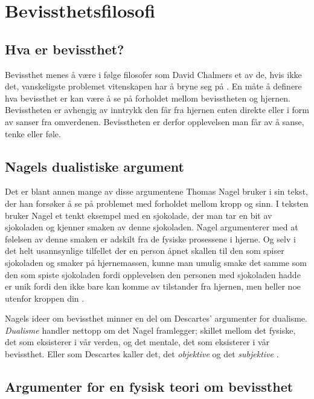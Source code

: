 \section{Bevissthetsfilosofi}

\subsection{Hva er bevissthet?}

Bevissthet menes å være i følge filosofer som David Chalmers et av de, hvis ikke det, 
vanskeligste problemet vitenskapen har å bryne seg på \autocite{Chalmers1995}. 
En måte å definere hva bevissthet er kan være å se på forholdet mellom bevisstheten og hjernen.
Bevisstheten er avhengig av inntrykk den får fra hjernen enten direkte eller i form av sanser fra omverdenen. 
Bevisstheten er derfor opplevelsen man får av å sanse, tenke eller føle. 

\subsection{Nagels dualistiske argument}

Det er blant annen mange av disse argumentene Thomas Nagel bruker i sin tekst, 
der han forsøker å se på problemet med forholdet mellom kropp og sinn.
I teksten bruker Nagel et tenkt eksempel med en sjokolade,
der man tar en bit av sjokoladen og kjenner smaken av denne sjokoladen. 
Nagel argumenterer med at følelsen av denne smaken er adskilt fra de fysiske prosessene i hjerne. 
Og selv i det helt usannsynlige tilfellet der en person åpnet skallen til den som spiser sjokoladen og smaker på hjernemassen, 
kunne man umulig smake det samme som den som spiste sjokoladen fordi opplevelsen den personen med sjokoladen hadde er unik fordi den ikke bare kan komme av tilstander fra hjernen, 
men heller noe utenfor kroppen din \autocite[32-34]{Nagel2003}. 

Nagels ideer om bevissthet minner en del om Descartes' argumenter for dualisme.
\textit{Dualisme} handler nettopp om det Nagel framlegger; 
skillet mellom det fysiske, det som eksisterer i vår verden, og det mentale, det som eksisterer i vår bevissthet. 
Eller som Descartes kaller det, det \textit{objektive} og det \textit{subjektive} \autocite[156]{Dybvig2003}.


\subsection{Argumenter for en fysisk teori om bevissthet}


